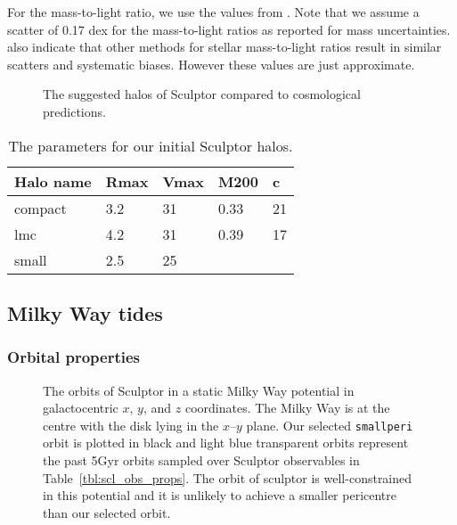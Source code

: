 For the mass-to-light ratio, we use the values from
\citet{woo+courteau+dekel2008}. Note that we assume a scatter of 0.17
dex for the mass-to-light ratios as reported for mass uncertainties.
\citet{delosreyes+2024} also indicate that other methods for stellar
mass-to-light ratios result in similar scatters and systematic biases.
However these values are just approximate.

\begin{figure}
\centering
{}
\caption[Sculptor initial halos]{The suggested halos of Sculptor
compared to cosmological predictions.}\label{fig:scl_halos}
\end{figure}

\begin{table*}[t]
\centering
\caption[Initial halos of Sculptor]{The parameters for our initial Sculptor halos. }
\label{tbl:scl_ini_halos}
\begin{tabular}{lllll}
\toprule
Halo name & Rmax & Vmax & M200 & c\\
\midrule
compact & 3.2 & 31 & 0.33 & 21\\
lmc & 4.2 & 31 & 0.39 & 17\\
small & 2.5 & 25 &  & \\
\bottomrule
\end{tabular}
\end{table*}

\subsection{Milky Way tides}\label{milky-way-tides}

\subsubsection{Orbital properties}\label{orbital-properties}

\begin{figure}
\centering
{}
\caption[Sculptor Orbits]{The orbits of Sculptor in a static Milky Way
potential in galactocentric \(x\), \(y\), and \(z\) coordinates. The
Milky Way is at the centre with the disk lying in the \(x\)--\(y\)
plane. Our selected \texttt{smallperi} orbit is plotted in black and
light blue transparent orbits represent the past 5Gyr orbits sampled
over Sculptor observables in Table~\ref{tbl:scl_obs_props}. The orbit of
sculptor is well-constrained in this potential and it is unlikely to
achieve a smaller pericentre than our selected orbit.
\the\textwidth}\label{fig:scl_orbits}
\end{figure}

